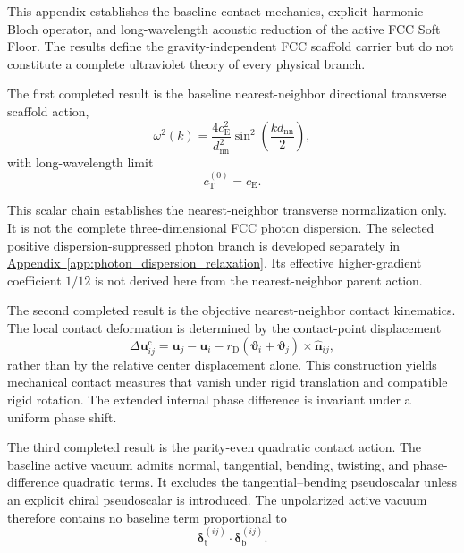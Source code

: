 This appendix establishes the baseline contact mechanics, explicit harmonic Bloch operator, and long-wavelength acoustic reduction of the active FCC Soft Floor. The results define the gravity-independent FCC scaffold carrier but do not constitute a complete ultraviolet theory of every physical branch.

The first completed result is the baseline nearest-neighbor directional transverse scaffold action,
\begin{equation}
    \omega^2(k) = \frac{4c_{\mathrm{E}}^2}{d_{\mathrm{nn}}^2} \sin^2 \left( \frac{kd_{\mathrm{nn}}}{2} \right),
\end{equation}
with long-wavelength limit
\begin{equation}
    c_{\mathrm{T}}^{(0)} = c_{\mathrm{E}}.
\end{equation}

This scalar chain establishes the nearest-neighbor transverse normalization only. It is not the complete three-dimensional FCC photon dispersion. The selected positive dispersion-suppressed photon branch is developed separately in \hyperref[app:photon_dispersion_relaxation]{Appendix~\ref*{app:photon_dispersion_relaxation}}. Its effective higher-gradient coefficient $1/12$ is not derived here from the nearest-neighbor parent action.

The second completed result is the objective nearest-neighbor contact kinematics. The local contact deformation is determined by the contact-point displacement
\begin{equation}
    \Delta\mathbf{u}_{ij}^{\mathrm{c}} = \mathbf{u}_j - \mathbf{u}_i - r_{\mathrm{D}} \left( \boldsymbol{\vartheta}_i + \boldsymbol{\vartheta}_j \right) \times \hat{\mathbf{n}}_{ij},
\end{equation}
rather than by the relative center displacement alone. This construction yields mechanical contact measures that vanish under rigid translation and compatible rigid rotation. The extended internal phase difference is invariant under a uniform phase shift.

The third completed result is the parity-even quadratic contact action. The baseline active vacuum admits normal, tangential, bending, twisting, and phase-difference quadratic terms. It excludes the tangential--bending pseudoscalar unless an explicit chiral pseudoscalar is introduced. The unpolarized active vacuum therefore contains no baseline term proportional to
\begin{equation}
    \boldsymbol{\delta}_{\mathrm{t}}^{(ij)} \cdot \boldsymbol{\delta}_{\mathrm{b}}^{(ij)}.
\end{equation}

